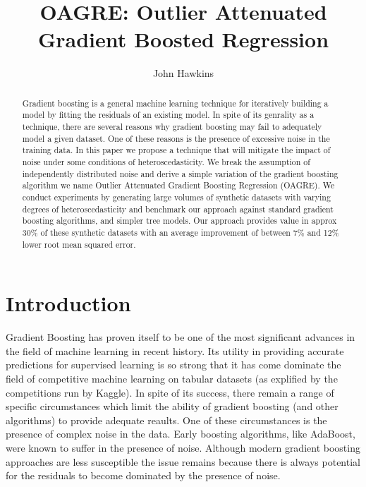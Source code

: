 \documentclass[12pt,a4paper]{article}
\begin{document}
\title{OAGRE: Outlier Attenuated Gradient Boosted Regression}

\author{John Hawkins}


\maketitle

\begin{abstract}

Gradient boosting is a general machine learning technique for iteratively building 
a model by fitting the residuals of an existing model.
In spite of its genrality as a technique, there are several reasons why gradient
boosting may fail to adequately model a given dataset. One of these reasons is the presence of 
excessive noise in the training data. In this paper we propose a technique that will
mitigate the impact of noise under some conditions of heteroscedasticity.
We break the assumption of independently distributed noise and derive a simple variation of
the gradient boosting algorithm we name Outlier Attenuated Gradient Boosting Regression (OAGRE).
We conduct experiments by generating large volumes of synthetic datasets with varying
degrees of heteroscedasticity and benchmark our approach against standard gradient
boosting algorithms, and simpler tree models. 
Our approach provides value in approx 30\% of these synthetic datasets with an average improvement
of between 7\% and 12\% lower root mean squared error.

\end{abstract}

\section{Introduction}

Gradient Boosting has proven itself to be one of the most significant advances in
the field of machine learning in recent history. Its utility in providing accurate predictions
for supervised learning is so strong that it has come dominate the field of competitive machine 
learning on tabular datasets (as explified by the competitions run by Kaggle\cite{kaggle}).
In spite of its success, there remain a range of specific circumstances which limit the ability of
gradient boosting (and other algorithms) to provide adequate reaults. One of these
circumstances is the presence of complex noise in the data.
Early boosting algorithms, like AdaBoost, were known
to suffer in the presence of noise\cite{Freund2001,Schapire2003}. Although modern gradient boosting
approaches are less susceptible the issue remains because there is always potential for the residuals 
to become dominated by the presence of noise.
\end{document}

